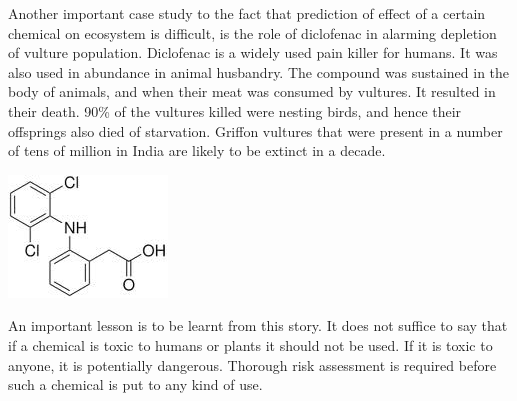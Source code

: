\documentclass[pdftex,12pt,a4paper]{article}
\begin{document}
Another important case study to the fact that prediction of effect of a certain chemical on ecosystem is difficult, is the role of diclofenac in alarming depletion of vulture population. Diclofenac is a widely used pain killer for humans. It was also used in abundance in animal husbandry. The compound was sustained in the body of animals, and when their meat was consumed by vultures. It resulted in their death. 90\% of the vultures killed were nesting birds, and hence their offsprings also died of starvation. Griffon vultures that were present in a number of tens of million in India are likely to be extinct in a decade.
\begin{center}
\includegraphics[scale=0.6]{diclo.jpg}
\end{center}

An important lesson is to be learnt from this story. It does not suffice to say that if a chemical is toxic to humans or plants it should not be used. If it is toxic to anyone, it is potentially dangerous. Thorough risk assessment is required before such a chemical is put to any kind of use.
\end{document}
